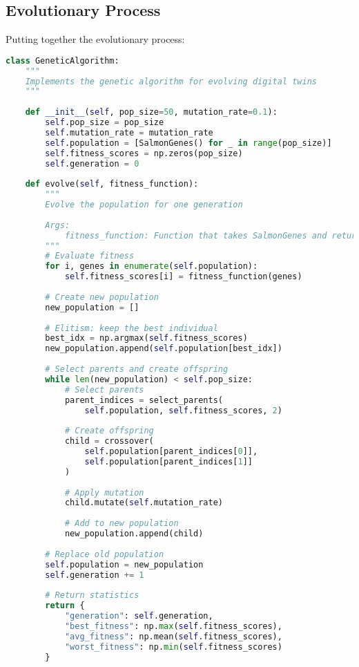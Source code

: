 \documentclass[11pt,a4paper]{article}
\begin{document}
\subsection{Evolutionary Process}
Putting together the evolutionary process:

\begin{lstlisting}[language=Python]
class GeneticAlgorithm:
    """
    Implements the genetic algorithm for evolving digital twins
    """
    
    def __init__(self, pop_size=50, mutation_rate=0.1):
        self.pop_size = pop_size
        self.mutation_rate = mutation_rate
        self.population = [SalmonGenes() for _ in range(pop_size)]
        self.fitness_scores = np.zeros(pop_size)
        self.generation = 0
        
    def evolve(self, fitness_function):
        """
        Evolve the population for one generation
        
        Args:
            fitness_function: Function that takes SalmonGenes and returns fitness
        """
        # Evaluate fitness
        for i, genes in enumerate(self.population):
            self.fitness_scores[i] = fitness_function(genes)
            
        # Create new population
        new_population = []
        
        # Elitism: keep the best individual
        best_idx = np.argmax(self.fitness_scores)
        new_population.append(self.population[best_idx])
        
        # Select parents and create offspring
        while len(new_population) < self.pop_size:
            # Select parents
            parent_indices = select_parents(
                self.population, self.fitness_scores, 2)
                
            # Create offspring
            child = crossover(
                self.population[parent_indices[0]],
                self.population[parent_indices[1]]
            )
            
            # Apply mutation
            child.mutate(self.mutation_rate)
            
            # Add to new population
            new_population.append(child)
            
        # Replace old population
        self.population = new_population
        self.generation += 1
        
        # Return statistics
        return {
            "generation": self.generation,
            "best_fitness": np.max(self.fitness_scores),
            "avg_fitness": np.mean(self.fitness_scores),
            "worst_fitness": np.min(self.fitness_scores)
        }
\end{lstlisting}
\end{document}
